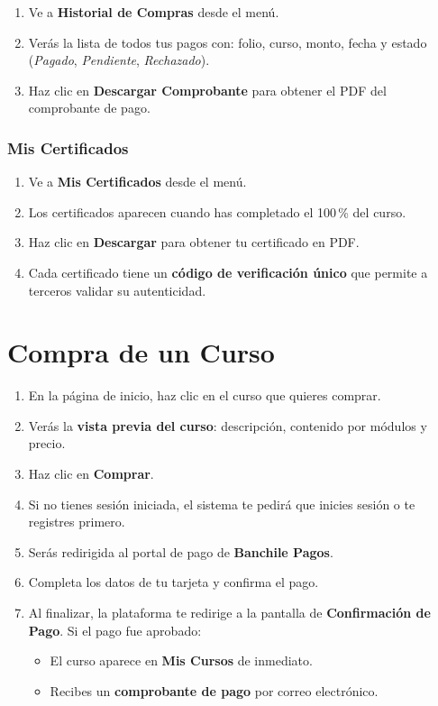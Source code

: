 \documentclass[a4paper,11pt]{article}
\begin{document}
\begin{enumerate}
  \item Ve a \textbf{Historial de Compras} desde el men\'u.
  \item Ver\'as la lista de todos tus pagos con: folio, curso, monto, fecha
        y estado (\emph{Pagado}, \emph{Pendiente}, \emph{Rechazado}).
  \item Haz clic en \textbf{Descargar Comprobante} para obtener el PDF
        del comprobante de pago.
\end{enumerate}

\subsubsection{Mis Certificados}

\begin{enumerate}
  \item Ve a \textbf{Mis Certificados} desde el men\'u.
  \item Los certificados aparecen cuando has completado el 100\,\% del curso.
  \item Haz clic en \textbf{Descargar} para obtener tu certificado en PDF.
  \item Cada certificado tiene un \textbf{c\'odigo de verificaci\'on \'unico}
        que permite a terceros validar su autenticidad.
\end{enumerate}

\section{Compra de un Curso}

\begin{enumerate}
  \item En la p\'agina de inicio, haz clic en el curso que quieres comprar.
  \item Ver\'as la \textbf{vista previa del curso}: descripci\'on, contenido
        por m\'odulos y precio.
  \item Haz clic en \textbf{Comprar}.
  \item Si no tienes sesi\'on iniciada, el sistema te pedir\'a que
        inicies sesi\'on o te registres primero.
  \item Ser\'as redirigida al portal de pago de \textbf{Banchile Pagos}.
  \item Completa los datos de tu tarjeta y confirma el pago.
  \item Al finalizar, la plataforma te redirige a la pantalla de
        \textbf{Confirmaci\'on de Pago}. Si el pago fue aprobado:
  \begin{itemize}
    \item El curso aparece en \textbf{Mis Cursos} de inmediato.
    \item Recibes un \textbf{comprobante de pago} por correo electr\'onico.
  \end{itemize}
\end{enumerate}
\end{document}
